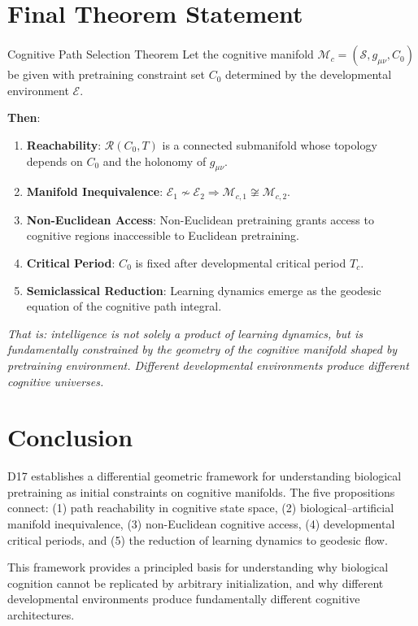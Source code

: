 \documentclass[12pt, a4paper]{article}
\begin{document}
\section{Final Theorem Statement}

\begin{thmbox}{Cognitive Path Selection Theorem}
Let the cognitive manifold $\mathcal{M}_c = (\mathcal{S}, g_{\mu\nu}, C_0)$ be given with pretraining constraint set $C_0$ determined by the developmental environment $\mathcal{E}$.

\textbf{Then}:
\begin{enumerate}
    \item \textbf{Reachability}: $\mathcal{R}(C_0, T)$ is a connected submanifold whose topology depends on $C_0$ and the holonomy of $g_{\mu\nu}$.
    \item \textbf{Manifold Inequivalence}: $\mathcal{E}_1 \not\sim \mathcal{E}_2 \Rightarrow \mathcal{M}_{c,1} \not\cong \mathcal{M}_{c,2}$.
    \item \textbf{Non-Euclidean Access}: Non-Euclidean pretraining grants access to cognitive regions inaccessible to Euclidean pretraining.
    \item \textbf{Critical Period}: $C_0$ is fixed after developmental critical period $T_c$.
    \item \textbf{Semiclassical Reduction}: Learning dynamics emerge as the geodesic equation of the cognitive path integral.
\end{enumerate}

\textit{That is: intelligence is not solely a product of learning dynamics, but is fundamentally constrained by the geometry of the cognitive manifold shaped by pretraining environment. Different developmental environments produce different cognitive universes.}
\end{thmbox}

\section{Conclusion}

D17 establishes a differential geometric framework for understanding biological pretraining as initial constraints on cognitive manifolds. The five propositions connect: (1) path reachability in cognitive state space, (2) biological--artificial manifold inequivalence, (3) non-Euclidean cognitive access, (4) developmental critical periods, and (5) the reduction of learning dynamics to geodesic flow.

This framework provides a principled basis for understanding why biological cognition cannot be replicated by arbitrary initialization, and why different developmental environments produce fundamentally different cognitive architectures.
\end{document}
